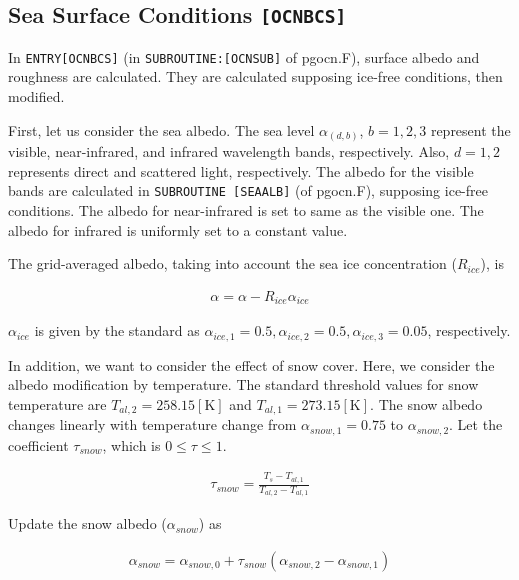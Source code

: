 \hypertarget{sea-surface-conditions-ocnbcs}{%
\subsection{\texorpdfstring{Sea Surface Conditions
\texttt{{[}OCNBCS{]}}}{Sea Surface Conditions {[}OCNBCS{]}}}\label{sea-surface-conditions-ocnbcs}}

In \texttt{ENTRY{[}OCNBCS{]}} (in \texttt{SUBROUTINE:{[}OCNSUB{]}} of
pgocn.F), surface albedo and roughness are calculated. They are
calculated supposing ice-free conditions, then modified.

First, let us consider the sea albedo. The sea level \(\alpha_{(d,b)}\),
\(b=1,2,3\) represent the visible, near-infrared, and infrared
wavelength bands, respectively. Also, \(d=1,2\) represents direct and
scattered light, respectively. The albedo for the visible bands are
calculated in \texttt{SUBROUTINE\ {[}SEAALB{]}} (of pgocn.F), supposing
ice-free conditions. The albedo for near-infrared is set to same as the
visible one. The albedo for infrared is uniformly set to a constant
value.

The grid-averaged albedo, taking into account the sea ice concentration
(\(R_{ice}\)), is

\begin{eqnarray}
    \alpha = \alpha -R_{ice} \alpha_{ice}
\end{eqnarray}

\(\alpha_{ice}\) is given by the standard as
\(\alpha_{ice,1}=0.5,\alpha_{ice,2}=0.5,\alpha_{ice,3}=0.05\),
respectively.

In addition, we want to consider the effect of snow cover. Here, we
consider the albedo modification by temperature. The standard threshold
values for snow temperature are \(T_{al,2}=258.15 \mathrm{[K]}\) and
\(T_{al,1}=273.15 \mathrm{[K]}\). The snow albedo changes linearly with
temperature change from \(\alpha_{snow,1}=0.75\) to
\(\alpha_{ snow,2}\). Let the coefficient \(\tau_{snow}\), which is
\(0\le \tau \le 1\).

\begin{eqnarray}
\tau_{snow} = \frac{T_s - T_{al,1}}{T_{al,2}-T_{al,1}}
\end{eqnarray}

Update the snow albedo (\(\alpha_{snow}\)) as

\begin{eqnarray}
    \alpha_{snow} = \alpha_{snow,0} + \tau_{snow}(\alpha_{snow,2}-\alpha_{snow,1})
\end{eqnarray}

